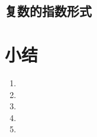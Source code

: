 \begin{Exercise}
  \begin{question}
    \item 
    \item 
    \item 
    \item 
    \item 
    \item 
    \item 
    \item 
    \item 
    \item 
    \item 
    \item 
    \item 
    \item 
    \item 
    \item 
    \item 
    \item 
    \item 
    \item 
  \end{question}
\end{Exercise}

\subsection{复数的指数形式}
\begin{Practice}
  \begin{question}
    \item 
    \item 
    \item 
    \item 
    \item 
    \item 
    \item 
    \item 
    \item 
    \item 
  \end{question}
\end{Practice}

\section*{小结}
\begin{enumerate}[C、,itemindent=4.5em]
  \item 
  \item 
  \item 
  \item 
  \item 
\end{enumerate}
